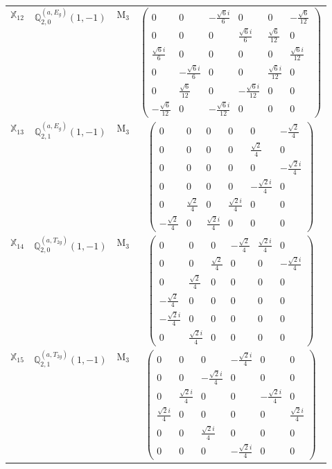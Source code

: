\documentclass[fleqn,10pt,landscape]{article}
\begin{document}
\begin{itemize}
\begin{center}
\begin{longtable}{c|c|c|c}
$ \mathbb{X}_{12} $ & $\mathbb{Q}_{2,0}^{(a,E_{g})}(1,-1)$ & M$_{3}$ & $\begin{pmatrix} 0 & 0 & - \frac{\sqrt{6} i}{6} & 0 & 0 & - \frac{\sqrt{6}}{12} \\ 0 & 0 & 0 & \frac{\sqrt{6} i}{6} & \frac{\sqrt{6}}{12} & 0 \\ \frac{\sqrt{6} i}{6} & 0 & 0 & 0 & 0 & \frac{\sqrt{6} i}{12} \\ 0 & - \frac{\sqrt{6} i}{6} & 0 & 0 & \frac{\sqrt{6} i}{12} & 0 \\ 0 & \frac{\sqrt{6}}{12} & 0 & - \frac{\sqrt{6} i}{12} & 0 & 0 \\ - \frac{\sqrt{6}}{12} & 0 & - \frac{\sqrt{6} i}{12} & 0 & 0 & 0 \end{pmatrix}$ \\
$ \mathbb{X}_{13} $ & $\mathbb{Q}_{2,1}^{(a,E_{g})}(1,-1)$ & M$_{3}$ & $\begin{pmatrix} 0 & 0 & 0 & 0 & 0 & - \frac{\sqrt{2}}{4} \\ 0 & 0 & 0 & 0 & \frac{\sqrt{2}}{4} & 0 \\ 0 & 0 & 0 & 0 & 0 & - \frac{\sqrt{2} i}{4} \\ 0 & 0 & 0 & 0 & - \frac{\sqrt{2} i}{4} & 0 \\ 0 & \frac{\sqrt{2}}{4} & 0 & \frac{\sqrt{2} i}{4} & 0 & 0 \\ - \frac{\sqrt{2}}{4} & 0 & \frac{\sqrt{2} i}{4} & 0 & 0 & 0 \end{pmatrix}$ \\
$ \mathbb{X}_{14} $ & $\mathbb{Q}_{2,0}^{(a,T_{2g})}(1,-1)$ & M$_{3}$ & $\begin{pmatrix} 0 & 0 & 0 & - \frac{\sqrt{2}}{4} & \frac{\sqrt{2} i}{4} & 0 \\ 0 & 0 & \frac{\sqrt{2}}{4} & 0 & 0 & - \frac{\sqrt{2} i}{4} \\ 0 & \frac{\sqrt{2}}{4} & 0 & 0 & 0 & 0 \\ - \frac{\sqrt{2}}{4} & 0 & 0 & 0 & 0 & 0 \\ - \frac{\sqrt{2} i}{4} & 0 & 0 & 0 & 0 & 0 \\ 0 & \frac{\sqrt{2} i}{4} & 0 & 0 & 0 & 0 \end{pmatrix}$ \\
$ \mathbb{X}_{15} $ & $\mathbb{Q}_{2,1}^{(a,T_{2g})}(1,-1)$ & M$_{3}$ & $\begin{pmatrix} 0 & 0 & 0 & - \frac{\sqrt{2} i}{4} & 0 & 0 \\ 0 & 0 & - \frac{\sqrt{2} i}{4} & 0 & 0 & 0 \\ 0 & \frac{\sqrt{2} i}{4} & 0 & 0 & - \frac{\sqrt{2} i}{4} & 0 \\ \frac{\sqrt{2} i}{4} & 0 & 0 & 0 & 0 & \frac{\sqrt{2} i}{4} \\ 0 & 0 & \frac{\sqrt{2} i}{4} & 0 & 0 & 0 \\ 0 & 0 & 0 & - \frac{\sqrt{2} i}{4} & 0 & 0 \end{pmatrix}$ \\

\end{longtable}
\end{center}
\end{itemize}
\end{document}
